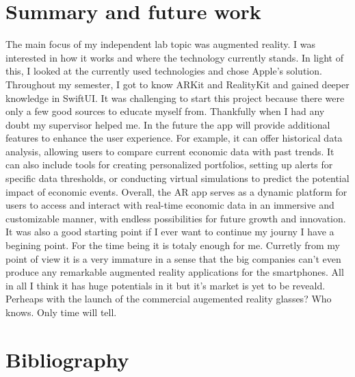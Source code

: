 \documentclass[a4paper,oneside]{article}
\begin{document}
\section{Summary and future work}
\label{sec:osszefoglalas}

The main focus of my independent lab topic was augmented reality. I was interested in how it works and where the technology currently stands.
In light of this, I looked at the currently used technologies and chose Apple's solution.
Throughout my semester, I got to know ARKit and RealityKit and gained deeper knowledge in SwiftUI.
\newblock
It was challenging to start this project because there were only a few good sources to educate myself from. Thankfully when I had any doubt my supervisor helped me.
In the future the app will provide additional features to enhance the user experience.
For example, it can offer historical data analysis, allowing users to compare current economic data with past trends. It can also include tools for creating personalized portfolios, setting up alerts for specific data thresholds, or conducting virtual simulations to predict the potential impact of economic events.
Overall, the AR app serves as a dynamic platform for users to access and interact with real-time economic data in an immersive and customizable manner, with endless possibilities for future growth and innovation.
It was also a good starting point if I ever want to continue my journy I have a begining point. For the time being it is totaly enough for me.
Curretly from my point of view it is a very immature in a sense that the big companies can't even produce any remarkable augmented reality applications for the smartphones. All in all I think it has huge potentials in it but it's market is yet to be reveald. Perheaps with the launch of the commercial augemented reality glasses? Who knows. Only time will tell.
\newpage

\section{Bibliography}
\label{sec:irod-es-csatl}
\end{document}
